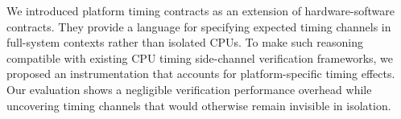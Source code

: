 We introduced platform timing contracts as an extension of hardware-software contracts.
They provide a language for specifying expected timing channels in full-system contexts rather than isolated CPUs.
To make such reasoning compatible with existing CPU timing side-channel verification frameworks, we proposed an instrumentation that accounts for platform-specific timing effects.
Our evaluation shows a negligible verification performance overhead while uncovering timing channels that would otherwise remain invisible in isolation.

